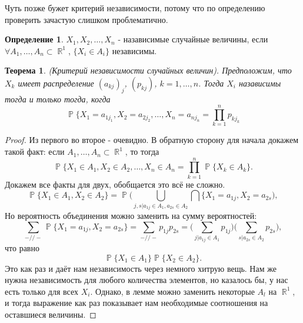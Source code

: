 \documentclass[a4paper,100pt]{article}
\theoremstyle{indented}
\newtheorem{theorem}{Теорема}
\theoremstyle{definition}
\newtheorem{defn}{Определение}
\theoremstyle{remark}
\DeclareMathOperator{\RR}{\mathbb{R}}
\DeclareMathOperator{\PP}{\mathbb{P}}
\begin{document}
Чуть позже бужет критерий независимости, потому что по определению проверить зачастую слишком проблематично. 

\begin{defn}
    $X_1, X_2, \ldots, X_n$ - назависимые случайные величины, если $\forall A_1, \ldots, A_n \subset \RR^1$, $\{X_i\in A_i\}$ независимы.
\end{defn}

\begin{theorem}
    (Критерий независимости случайных величин). Предположим, что $X_k$ имеет распределение $(a_{kj})_j$, $(p_{kj})$, $k=1, \ldots, n$. Тогда $X_i$ назависимы тогда и только тогда, когда 
    \[
        \PP\{X_1=a_{1j_1}, X_2=a_{2j_2}, \ldots, X_n=a_{nj_n} = \prod_{k=1}^n p_{kj_k}
    \]
\end{theorem}

\begin{proof}
    Из первого во второе - очевидно. В обратную сторону для начала докажем такой факт: если $A_1, \ldots, A_n \subset \RR^1$, то тогда
    \[
        \PP\{X_1\in A_1, X_2\in A_2, \ldots, X_n \in A_n = \prod_{k=1}^n \PP \{X_k \in A_k\}. 
    \]
    Докажем все факты для двух, обобщается это всё не сложно. 
    \[
        \PP\{X_1\in A_1, X_2\in A_2\}=\PP\biggl( \bigcup_{j, s|a_{1j}\in A_1, a_{2s}\in A_2} \bigcap \{X_1=a_{1j}, X_2=a_{2s} \biggr), 
    \]
    Но вероятность объединения можно заменить на сумму вероятностей: 
    \[
        \sum_{-//-}\PP\{X_1=a_{1j}, X_2=a_{2s}\} = \sum_{-//-}p_{1j}p_{2s} = \biggl( \sum_{j|a_{1j}\in A_1} p_{1j}\biggr)\biggl( \sum_{s|a_{2s}\in A_2} p_{2s}\biggr), 
    \]
    что равно 
    \[
        \PP\{X_1\in A_1\} \PP\{X_2 \in A_2\}. 
    \]
    Это как раз и даёт нам независимость через немного хитрую вещь. Нам же нужна независимость для любого количества элементов, но казалось бы, у нас есть только для всех $X_i$. Однако, в лемме можно заменить некоторые $A_l$ на $\RR^1$, и тогда выражение как раз показывает нам необходимые соотношения на оставшиеся величины. 
\end{proof}
\end{document}
